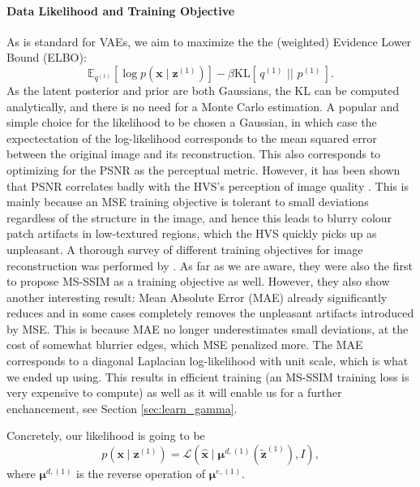 \documentclass{article}
\renewcommand{\vec}[1]{\mathbf{#1}}
\newcommand{\KL}[2]{\mathrm{KL}[\,#1\,\,||\,\,#2\,]}
\newcommand{\Exp}{\mathbb{E}}
\newcommand{\Laplace}[1]{\mathcal{L}\left( #1 \right)}
\newcommand{\MU}{\boldsymbol\mu}
\begin{document}
\paragraph{Data Likelihood and Training Objective}
As is standard for VAEs, we aim to maximize the the (weighted) Evidence
Lower Bound (ELBO):
\begin{equation}
\label{eq:regular_vae_elbo}
\Exp_{q^{(1)}}[\log p(\vec{x} \mid \vec{z}^{(1)})] - \beta\KL{q^{(1)}}{p^{(1)}}.
\end{equation}
As the latent posterior and prior are both Gaussians, the KL can be computed
analytically, and there is no need for a Monte Carlo estimation. A popular and
simple choice for the likelihood to be chosen a Gaussian, in which case the
expectectation of the log-likelihood corresponds to the mean squared error
between the original image and its reconstruction. This also corresponds to
optimizing for the PSNR as the perceptual metric. However, it has been shown
that PSNR correlates badly with the HVS's perception of image quality \cite{girod1993s}
\cite{eskicioglu1994image}. This is mainly because an MSE training objective is
tolerant to small deviations regardless of the structure in the image, and hence
this leads to blurry colour patch artifacts in low-textured regions, which the
HVS quickly picks up as unpleasant. A thorough survey of different
training objectives for image reconstruction was performed by
\cite{zhao2015loss}. As far as we are aware, they were also the first to propose
MS-SSIM as a training objective as well. However, they also show another
interesting result: Mean Absolute Error (MAE) already significantly reduces and
in some cases completely removes the unpleasant artifacts introduced by MSE.
This is because MAE no longer underestimates small deviations, at the cost of
somewhat blurrier edges, which MSE penalized more. The MAE corresponds to a
diagonal Laplacian log-likelihood with unit scale, which is what we ended up
using. This results in
efficient training (an MS-SSIM training loss is very expensive to compute) as
well as it will enable us for a further enchancement, see Section
\ref{sec:learn_gamma}.

Concretely, our likelihood is going to be
\begin{equation}
\label{eq:laplace_likelihood}
  p(\vec{x} \mid \vec{z}^{(1)}) = \Laplace{\vec{\hat{x}} \mid
  \MU^{d, (1)}(\vec{\tilde{z}}^{(1)}), I},
\end{equation}
where $\MU^{d, (1)}$ is the reverse operation of $\MU^{e, (1)}$.
\end{document}

